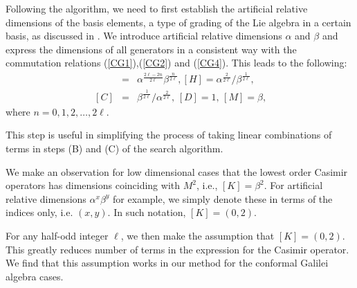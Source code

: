 \documentclass[12pt]{article}
\begin{document}
Following the algorithm, we need to first establish the artificial relative dimensions of
the basis elements, a type of grading of the Lie algebra in a certain basis, as
discussed in \cite{Als17}. We introduce artificial relative dimensions $\alpha$ and
$\beta$ and express the dimensions of all generators in a consistent way with
the commutation relations (\ref{CG1}),(\ref{CG2}) and (\ref{CG4}).
This leads to the following:
\begin{eqnarray}
[P_ {n}]&=&{\alpha^{\frac{2\ell-2n}{2\ell}}}{ \beta^{\frac{n}{2\ell}}},
[H]={\alpha^{\frac{2}{2\ell}}}/{ \beta^{\frac{1}{2\ell}}} ,\ \label{th7}  
\\
 \, [C]&=&{\beta^{\frac{1}{2\ell}}}/ {\alpha^{\frac{2}{2\ell}}}, \, [D]=1, \,  [M]=\beta, \nonumber 
\end{eqnarray} 
where $n = 0,1, 2, \ldots , 2\ell$. 

This step is useful in simplifying the process of taking linear combinations of
terms in steps (B) and (C) of the search algorithm.

We make an observation for low dimensional cases that the lowest order Casimir
operators has dimensions coinciding with $ M^2$, i.e., $[K]=\beta^2$. For
artificial relative dimensions $\alpha^x\beta^y$ for example, we simply denote
these in terms of the indices only, i.e. $(x,y)$. In such notation,
$[K]=(0,2)$.

For any half-odd integer $\ell$, we then make the assumption  that
$[K]=(0,2)$. This greatly reduces number of terms in the expression for the
Casimir operator. We find that this assumption works in our method for the
conformal Galilei algebra cases.
\end{document}
